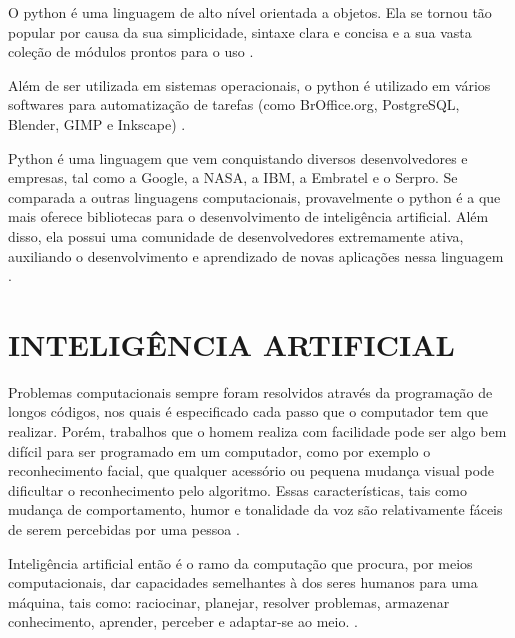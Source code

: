 O python é uma linguagem de alto nível orientada a objetos. Ela se tornou tão popular por causa da sua simplicidade, sintaxe clara e concisa e a sua vasta coleção de módulos prontos para o uso \cite{borges2014python}. 

Além de ser utilizada em sistemas operacionais, o python é utilizado em vários softwares para automatização de tarefas (como BrOffice.org, PostgreSQL, Blender, GIMP e Inkscape) \cite{borges2014python}. 

Python é uma linguagem que vem conquistando diversos desenvolvedores e empresas, tal como a Google, a NASA, a IBM, a Embratel e o Serpro. Se comparada a outras linguagens computacionais, provavelmente o python é a que mais oferece bibliotecas para o desenvolvimento de inteligência artificial. Além disso, ela possui uma comunidade de desenvolvedores extremamente ativa, auxiliando o desenvolvimento e aprendizado de novas aplicações nessa linguagem \cite{jonasgranatyr}. 

\section{INTELIGÊNCIA ARTIFICIAL }
\label{sec:INTELIGÊNCIA ARTIFICIAL }

Problemas computacionais sempre foram resolvidos através da programação de
longos códigos, nos quais é especificado cada passo que o computador tem que realizar. Porém, trabalhos que o homem realiza com facilidade pode ser algo bem difícil para ser programado em um computador, como por exemplo o reconhecimento facial, que qualquer acessório ou pequena mudança visual pode dificultar o reconhecimento pelo algoritmo. Essas características, tais como mudança de comportamento, humor e tonalidade da voz são relativamente fáceis de serem percebidas por uma pessoa \cite{lorenafaceli2011inteligencia}. 

 
Inteligência artificial então é o ramo da computação que procura, por meios computacionais, dar capacidades semelhantes à dos seres humanos para uma máquina, tais como: raciocinar, planejar, resolver problemas, armazenar conhecimento, aprender, perceber e adaptar-se ao meio. \cite{Fernando}.

